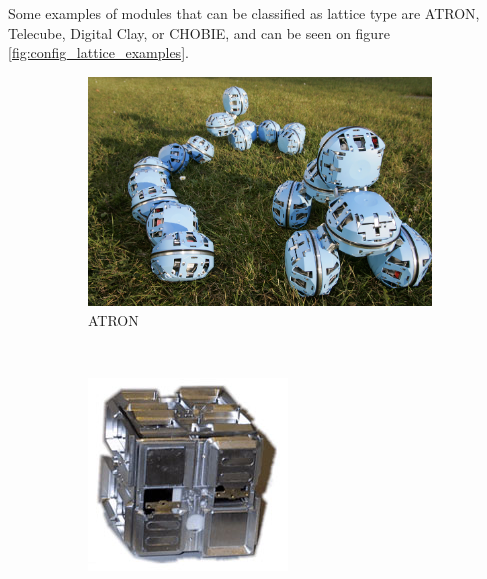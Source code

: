 Some examples of modules that can be classified as lattice type are ATRON, Telecube, Digital Clay, or CHOBIE, and can be seen on figure \ref{fig:config_lattice_examples}.\\

\begin{figure}[h]
		\centering
        \begin{subfigure}[b]{0.25\textwidth}
                \centering
                \includegraphics[width=\textwidth]{images/ATRON01.jpg}
                \caption{ATRON}
                \label{fig:ATRON}
        \end{subfigure}
        ~
        \begin{subfigure}[b]{0.18\textwidth}
                \centering
                \includegraphics[width=\textwidth]{images/Telecube.jpg}

\end{subfigure}
\end{figure}

